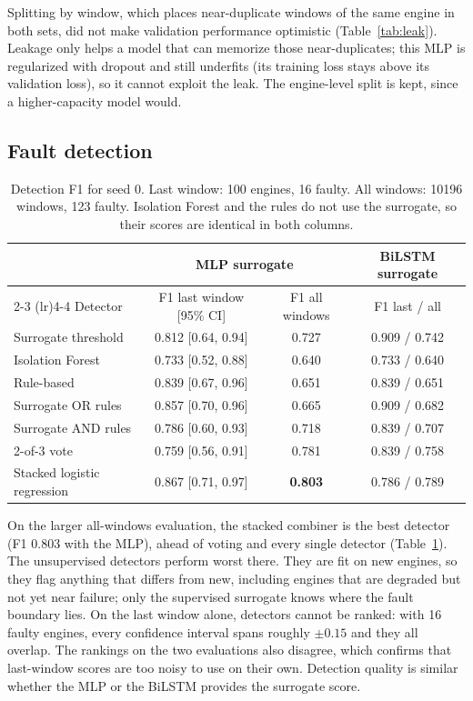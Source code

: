 \documentclass[11pt,a4paper]{article}
\begin{document}
Splitting by window, which places near-duplicate windows of the same engine in
both sets, did not make validation performance optimistic
(Table~\ref{tab:leak}). Leakage only helps a model that can memorize those
near-duplicates; this MLP is regularized with dropout and still underfits
(its training loss stays above its validation loss), so it cannot exploit the
leak. The engine-level split is kept, since a higher-capacity model would.

\subsection{Fault detection}

\begin{table}[h]
\centering
\small
\begin{tabular}{lccc}
\toprule
& \multicolumn{2}{c}{MLP surrogate} & BiLSTM surrogate \\
\cmidrule(lr){2-3} \cmidrule(lr){4-4}
Detector & F1 last window [95\% CI] & F1 all windows & F1 last / all \\
\midrule
Surrogate threshold & 0.812 [0.64, 0.94] & 0.727 & 0.909 / 0.742 \\
Isolation Forest    & 0.733 [0.52, 0.88] & 0.640 & 0.733 / 0.640 \\
Rule-based          & 0.839 [0.67, 0.96] & 0.651 & 0.839 / 0.651 \\
Surrogate OR rules  & 0.857 [0.70, 0.96] & 0.665 & 0.909 / 0.682 \\
Surrogate AND rules & 0.786 [0.60, 0.93] & 0.718 & 0.839 / 0.707 \\
2-of-3 vote         & 0.759 [0.56, 0.91] & 0.781 & 0.839 / 0.758 \\
Stacked logistic regression & 0.867 [0.71, 0.97] & \textbf{0.803} & 0.786 / 0.789 \\
\bottomrule
\end{tabular}
\caption{Detection F1 for seed 0. Last window: 100 engines, 16 faulty. All
windows: \num{10196} windows, 123 faulty. Isolation Forest and the rules do
not use the surrogate, so their scores are identical in both columns.}
\label{tab:det}
\end{table}

On the larger all-windows evaluation, the stacked combiner is the best
detector (F1 0.803 with the MLP), ahead of voting and every single detector
(Table~\ref{tab:det}). The unsupervised detectors perform worst there. They are
fit on new engines, so they flag anything that differs from new, including
engines that are degraded but not yet near failure; only the supervised
surrogate knows where the fault boundary lies. On the last window alone,
detectors cannot be ranked: with 16 faulty engines, every confidence interval
spans roughly $\pm 0.15$ and they all overlap. The rankings on the two
evaluations also disagree, which confirms that last-window scores are too
noisy to use on their own. Detection quality is similar whether the MLP or the
BiLSTM provides the surrogate score.
\end{document}
